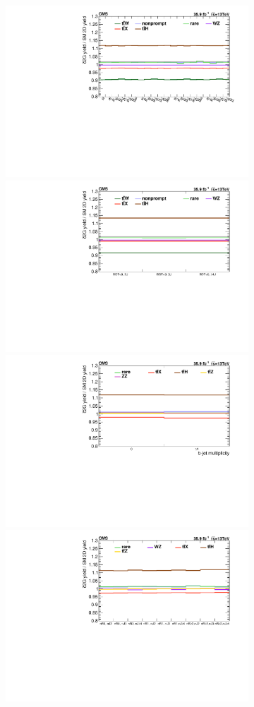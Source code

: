 \begin{figure}
  \begin{subfigure}{\linewidth}
    \centering
      \includegraphics[width=0.5\linewidth]{figures/thirteen-TeV/postfit/ratio_2l_c2G}%
      \includegraphics[width=0.5\linewidth]{figures/thirteen-TeV/postfit/ratio_2l-cr_c2G}
      \includegraphics[width=0.5\linewidth]{figures/thirteen-TeV/postfit/ratio_4l_c2G}%
      \includegraphics[width=0.5\linewidth]{figures/thirteen-TeV/postfit/ratio_3l_c2G}
    \caption{}
    \label{sfig:ratio-c2G}
  \end{subfigure}
  \begin{subfigure}{\linewidth}
    \centering

\end{subfigure}
\end{figure}
